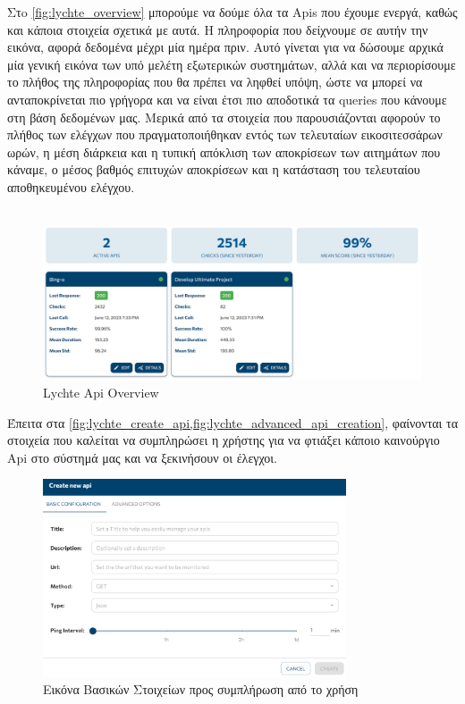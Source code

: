 Στo \autoref{fig:lychte_overview} μπορούμε να δούμε όλα τα Apis που έχουμε ενεργά, καθώς και κάποια στοιχεία σχετικά με αυτά.
Η πληροφορία που δείχνουμε σε αυτήν την εικόνα, αφορά δεδομένα μέχρι μία ημέρα πριν. Αυτό γίνεται για να δώσουμε αρχικά μία γενική εικόνα
των υπό μελέτη εξωτερικών συστημάτων, αλλά και να περιορίσουμε το πλήθος της πληροφορίας που θα πρέπει να ληφθεί υπόψη,
ώστε να μπορεί να ανταποκρίνεται πιο γρήγορα και να είναι έτσι πιο αποδοτικά τα queries που κάνουμε στη βάση δεδομένων μας. Μερικά από
τα στοιχεία που παρουσιάζονται αφορούν το πλήθος των ελέγχων που πραγματοποιήθηκαν εντός των τελευταίων εικοσιτεσσάρων ωρών, η μέση διάρκεια και η τυπική
απόκλιση των αποκρίσεων των αιτημάτων που κάναμε, ο μέσος βαθμός επιτυχών αποκρίσεων και η κατάσταση του τελευταίου αποθηκευμένου ελέγχου. \\
\\

\begin{figure}[!ht]
	\centering
	\includegraphics[width=1\textwidth]{./images/chapter5/overview_landing.png}
	\caption[Lychte Api Overview]{Lychte Api Overview}
	\label{fig:lychte_overview}
\end{figure}

\clearpage

Έπειτα στα \cref{fig:lychte_create_api,fig:lychte_advanced_api_creation}, φαίνονται
τα στοιχεία που καλείται να συμπληρώσει η χρήστης για να φτιάξει κάποιο καινούργιο Api στο σύστημά μας και να ξεκινήσουν
οι έλεγχοι. \\

\begin{figure}[!ht]
	\centering
	\includegraphics[width=0.8\textwidth]{./images/chapter5/api_creation.png}
	\caption[Εικόνα Βασικών Στοιχείων προς συμπλήρωση από το χρήση]{Εικόνα Βασικών Στοιχείων προς συμπλήρωση από το χρήση}
	\label{fig:lychte_create_api}
\end{figure}

